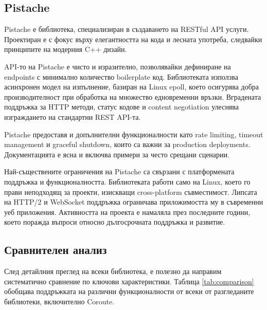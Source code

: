 \subsection{Pistache}

Pistache \cite{pistache} е библиотека, специализиран в създаването на RESTful API услуги. Проектиран е с фокус върху елегантността на кода и лесната употреба, следвайки принципите на модерния C++ дизайн.

API-то на Pistache е чисто и изразително, позволявайки дефиниране на endpoints с минимално количество boilerplate код. Библиотеката използва асинхронен модел на изпълнение, базиран на Linux epoll, което осигурява добра производителност при обработка на множество едновременни връзки. Вградената поддръжка за HTTP методи, статус кодове и content negotiation улеснява изграждането на стандартни REST API-та.

Pistache предоставя и допълнителни функционалности като rate limiting, timeout management и graceful shutdown, които са важни за production deployments. Документацията е ясна и включва примери за често срещани сценарии.

Най-съществените ограничения на Pistache са свързани с платформената поддръжка и функционалността. Библиотеката работи само на Linux, което го прави неподходящ за проекти, изискващи cross-platform съвместимост. Липсата на HTTP/2 и WebSocket поддръжка ограничава приложимостта му в съвременни уеб приложения. Активността на проекта е намаляла през последните години, което поражда въпроси относно дългосрочната поддръжка и развитие.

\subsection{Сравнителен анализ}

След детайлния преглед на всеки библиотека, е полезно да направим систематично сравнение по ключови характеристики. Таблица \ref{tab:comparison} обобщава поддръжката на различни функционалности от всеки от разгледаните библиотеки, включително Coroute.

